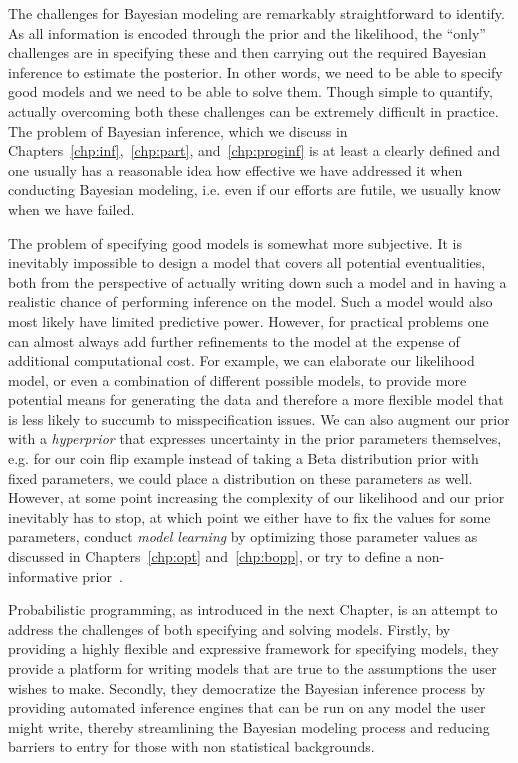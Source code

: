The challenges for Bayesian modeling are remarkably straightforward to identify.  As all information
is encoded through the prior and the likelihood, the ``only'' challenges are in specifying these
and then carrying out the required Bayesian inference to estimate the posterior.  In other words, we need
to be able to specify good models and we need to be able to solve them.  Though simple to
quantify, actually overcoming both these challenges can be extremely difficult in practice.  The problem
of Bayesian inference, which we discuss in Chapters~\ref{chp:inf},~\ref{chp:part}, and~\ref{chp:proginf}
 is at least a clearly defined and one usually has a reasonable idea
how effective we have addressed it when conducting Bayesian modeling, i.e. even if our efforts are
futile, we usually know when we have failed.  

The problem of specifying good models is somewhat more subjective.  It is inevitably impossible
to design a model that covers all potential eventualities, both from the perspective of actually writing
down such a model and in having a realistic chance of performing inference on the model.  Such a model
would also most likely have limited predictive power.  However, for practical problems one can almost always
add further refinements to the model at the expense of additional computational cost. For example, we can
elaborate our likelihood model, or even a combination of different possible models, to provide more 
potential means  for generating the data and therefore a more flexible model that is less likely to 
succumb to misspecification issues.  We can also augment our prior with a \emph{hyperprior} that 
expresses uncertainty in the prior parameters themselves, e.g. for our coin flip example instead of
taking a Beta distribution prior with fixed parameters, we could place a distribution on these parameters
as well.  However, at some point increasing the complexity of our likelihood and our prior inevitably 
has to stop, at which point we either have to fix the values for some parameters, conduct
\emph{model learning} by optimizing those parameter values as discussed in Chapters~\ref{chp:opt}
and~\ref{chp:bopp}, or try to define a non-informative prior~\citep{robert2007bayesian}.


Probabilistic programming, as introduced in the next Chapter, is an
attempt to address the challenges of both specifying and solving models.  
Firstly, by providing a highly flexible and expressive framework for specifying models, 
they provide a platform for writing models that are true to the assumptions the user wishes
to make.  Secondly, they democratize the Bayesian inference process by providing automated
inference engines that can be run on any model the user might write, thereby streamlining the Bayesian
modeling process and reducing barriers to entry for those with non statistical backgrounds.